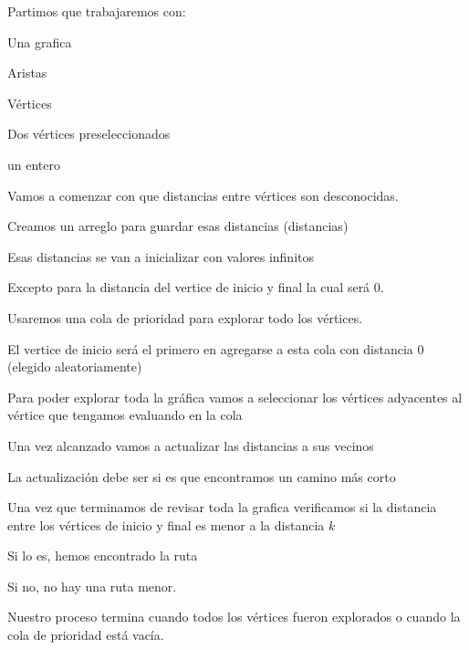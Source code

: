 \begin{myitemize}
    \item Partimos que trabajaremos con:
    \begin{myitemize}
        \item Una grafica
        \item Aristas
        \item Vértices
        \item Dos vértices preseleccionados 
        \item un entero
    \end{myitemize}

    \item Vamos a comenzar con que distancias entre vértices son desconocidas. 
    \item Creamos un arreglo para guardar esas distancias (distancias) 
    \item Esas distancias se van a inicializar con valores infinitos 
    \item Excepto para la distancia del vertice de inicio y final la cual será 0.

    \item Usaremos una cola de prioridad para explorar todo los vértices. 
    \item El vertice de inicio será el primero en agregarse a esta cola con distancia 0 (elegido aleatoriamente)
    
    \item Para poder explorar toda la gráfica vamos a seleccionar los vértices adyacentes al vértice que 
    tengamos evaluando en la cola 
    \item Una vez alcanzado vamos a actualizar las distancias a sus vecinos 
    \item La actualización debe ser si es que encontramos un camino más corto
        
    \item Una vez que terminamos de revisar toda la grafica verificamos si la distancia entre los vértices de 
        inicio y final es menor a la distancia $k$
    \item Si lo es, hemos encontrado la ruta
    \item Si no, no hay una ruta menor.
    \item Nuestro proceso termina cuando todos los vértices fueron explorados o cuando la cola de prioridad está vacía.
\end{myitemize}


